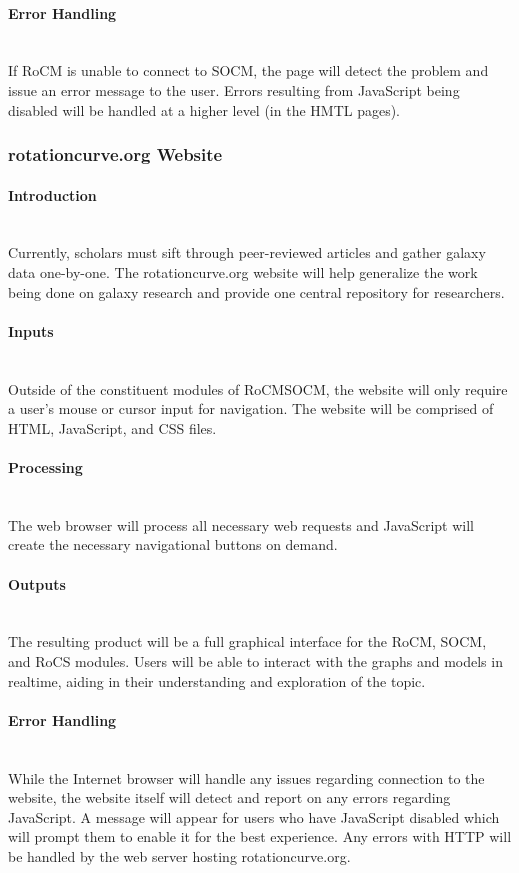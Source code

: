\documentclass[titlepage]{article}
\newcommand{\myparagraph}[1]{\paragraph{#1}\mbox{}\\}
\begin{document}
\myparagraph{Error Handling}
If RoCM is unable to connect to SOCM, the page will detect the problem and issue an error message to the user. Errors resulting from JavaScript being disabled will be handled at a higher level (in the HMTL pages).

\subsubsection{rotationcurve.org Website}

\myparagraph{Introduction}
Currently, scholars must sift through peer-reviewed articles and gather galaxy data one-by-one. The rotationcurve.org website will help generalize the work being done on galaxy research and provide one central repository for researchers.

\myparagraph{Inputs}
Outside of the constituent modules of RoCMSOCM, the website will only require a user's mouse or cursor input for navigation. The website will be comprised of HTML, JavaScript, and CSS files. 

\myparagraph{Processing}
The web browser will process all necessary web requests and JavaScript will create the necessary navigational buttons on demand.

\myparagraph{Outputs}
The resulting product will be a full graphical interface for the RoCM, SOCM, and RoCS modules. Users will be able to interact with the graphs and models in realtime, aiding in their understanding and exploration of the topic.


\myparagraph{Error Handling}
While the Internet browser will handle any issues regarding connection to the website, the website itself will detect and report on any errors regarding JavaScript. A message will appear for users who have JavaScript disabled which will prompt them to enable it for the best experience. Any errors with HTTP will be handled by the web server hosting rotationcurve.org.
\end{document}
